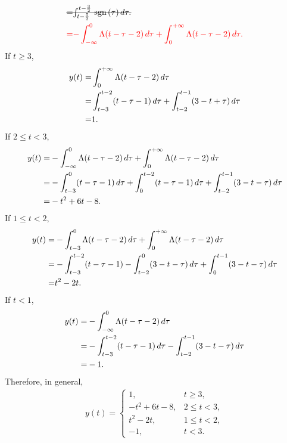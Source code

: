 \documentclass{assignment}
\begin{document}
\begin{sol}
\begin{itemize}
\begin{align}
            \notag\text{\sout{$=$}}&\text{\sout{$\int_{t-\frac{5}{2}}^{t-\frac{3}{2}}\sgn(\tau)\,d\tau.$}}\\
            {\color{red}=}&{\color{red}-\int_{-\infty}^0\Lambda(t-\tau-2)\,d\tau+\int_0^{+\infty}\Lambda(t-\tau-2)\,d\tau.}
        \end{align}
        {\color{red}
            If $t\geq 3$,
            \begin{align}
                \notag y(t)=&\int_0^{+\infty}\Lambda(t-\tau-2)\,d\tau\\
                \notag=&\int_{t-3}^{t-2}(t-\tau-1)\,d\tau+\int_{t-2}^{t-1}(3-t+\tau)\,d\tau\\
                =&1.
            \end{align}
            If $2\leq t<3$,
            \begin{align}
                \notag y(t)=&-\int_{-\infty}^0\Lambda(t-\tau-2)\,d\tau+\int_0^{+\infty}\Lambda(t-\tau-2)\,d\tau\\
                \notag=&-\int_{t-3}^0(t-\tau-1)\,d\tau+\int_0^{t-2}(t-\tau-1)\,d\tau+\int_{t-2}^{t-1}(3-t-\tau)\,d\tau\\
                =&-t^2+6t-8.
            \end{align}
            If $1\leq t<2$,
            \begin{align}
                \notag y(t)=&-\int_{t-3}^0\Lambda(t-\tau-2)\,d\tau+\int_0^{+\infty}\Lambda(t-\tau-2)\,d\tau\\
                \notag=&-\int_{t-3}^{t-2}(t-\tau-1)-\int_{t-2}^0(3-t-\tau)\,d\tau+\int_0^{t-1}(3-t-\tau)\,d\tau\\
                =&t^2-2t.
            \end{align}
            If $t<1$,
            \begin{align}
                \notag y(t)=&-\int_{-\infty}^0\Lambda(t-\tau-2)\,d\tau\\
                \notag=&-\int_{t-3}^{t-2}(t-\tau-1)\,d\tau-\int_{t-2}^{t-1}(3-t-\tau)\,d\tau\\
                =&-1.
            \end{align}
            Therefore, in general,
            \begin{align}
                y(t)=\left\{\begin{array}{ll}
                    1,&t\geq 3,\\
                    -t^2+6t-8,&2\leq t<3,\\
                    t^2-2t,&1\leq t<2,\\
                    -1,&t<3.
                \end{array}\right.
            \end{align}
        }
    \end{itemize}
\end{sol}
\end{document}
